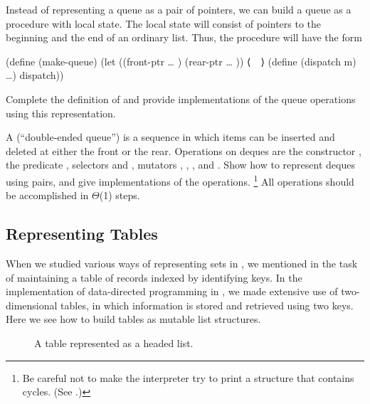 \begin{exercise}
	\label{Exercise 3.22}
	Instead of representing a queue as a pair of pointers, we can build a queue as a procedure with local state.
	The local state will consist of pointers to the beginning and the end of an ordinary list.
	Thus, the  procedure will have the form
	\begin{scheme}
	  (define (make-queue)
	    (let ((front-ptr … )
	          (rear-ptr … ))
	      ⟨~~⟩
	      (define (dispatch m) …)
	      dispatch))
	\end{scheme}
	Complete the definition of  and provide implementations of the queue operations using this representation.
\end{exercise}



\begin{exercise}
	\label{Exercise 3.23}
		A  (“double-ended queue”) is a sequence in which items can be inserted and deleted at either the front or the rear.
		Operations on deques are the constructor , the predicate , selectors  and , mutators , , , and .
		Show how to represent deques using pairs, and give implementations of the operations.%
	\footnote{
		Be careful not to make the interpreter try to print a structure that contains cycles.
		(See .)
	}
	All operations should be accomplished in \( Θ \)(1) steps.
\end{exercise}



\subsection{Representing Tables}
\label{Section 3.3.3}

When we studied various ways of representing sets in , we mentioned in  the task of maintaining a table of records indexed by identifying keys.
In the implementation of data-directed programming in , we made extensive use of two-dimensional tables, in which information is stored and retrieved using two keys.
Here we see how to build tables as mutable list structures.

\begin{figure}[tb]
	\centering
	
	\caption{
		A table represented as a headed list.
	}
	\label{Figure 3.22}
\end{figure}

